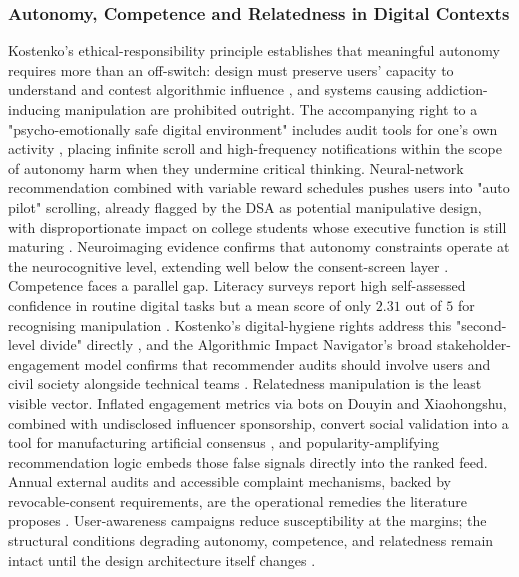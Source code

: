 \documentclass[11pt]{article}
\begin{document}
\subsubsection{Autonomy, Competence and Relatedness in Digital Contexts}
\label{sec:autonomy_competence_relatedness_digital} Kostenko's ethical-responsibility principle establishes that meaningful autonomy requires more than an off-switch: design must preserve users' capacity to understand and contest algorithmic influence \parencites[61--62]{2977039}, and systems causing addiction-inducing manipulation are prohibited outright. The accompanying right to a "psycho-emotionally safe digital environment" includes audit tools for one's own activity \parencites[119]{2977039}[2]{8958037}, placing infinite scroll and high-frequency notifications within the scope of autonomy harm when they undermine critical thinking. Neural-network recommendation combined with variable reward schedules pushes users into "auto pilot" scrolling, already flagged by the DSA as potential manipulative design, with disproportionate impact on college students whose executive function is still maturing \parencites[2]{8958037}. Neuroimaging evidence confirms that autonomy constraints operate at the neurocognitive level, extending well below the consent-screen layer \parencites[2]{3303310}. Competence faces a parallel gap. Literacy surveys report high self-assessed confidence in routine digital tasks but a mean score of only $2.31$ out of $5$ for recognising manipulation \parencites[31]{9360054}. Kostenko's digital-hygiene rights address this "second-level divide" directly \parencites[119]{2977039}, and the Algorithmic Impact Navigator's broad stakeholder-engagement model confirms that recommender audits should involve users and civil society alongside technical teams \parencites[2]{2742041}[25]{4900172}. Relatedness manipulation is the least visible vector. Inflated engagement metrics via bots on Douyin and Xiaohongshu, combined with undisclosed influencer sponsorship, convert social validation into a tool for manufacturing artificial consensus \parencites[13]{7160486}, and popularity-amplifying recommendation logic embeds those false signals directly into the ranked feed. Annual external audits and accessible complaint mechanisms, backed by revocable-consent requirements, are the operational remedies the literature proposes \parencites[119]{2977039}[81]{2977039}[7]{8453044}. User-awareness campaigns reduce susceptibility at the margins; the structural conditions degrading autonomy, competence, and relatedness remain intact until the design architecture itself changes \parencites[61--62]{2977039}[119]{2977039}[31]{9360054}[13]{7160486}.
\end{document}
